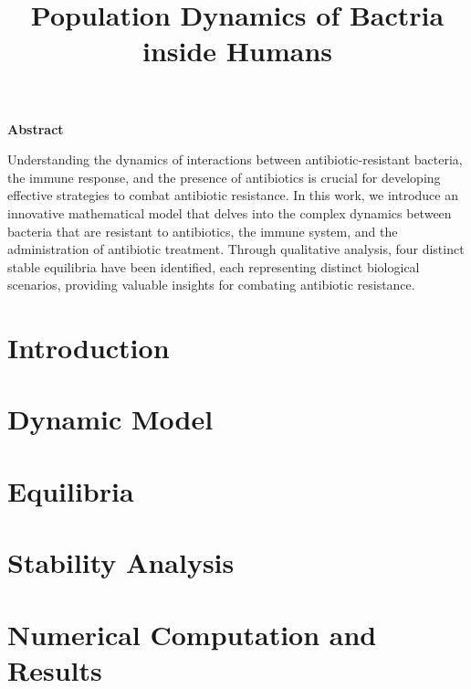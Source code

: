 \documentclass[11pt]{article}
\title{Population Dynamics of Bactria inside Humans}
\date{}
\theoremstyle{definition}
\begin{document}
	\graphicspath{{../figs/}}
	
	
	
	\newpage
	\setcounter{page}{2}
	
	\begin{center}
		\LARGE{\textbf{Abstract}}
		
		\vspace{1cm}
		
		
	\end{center}
	
	\begin{flushleft}
		\Large 
		Understanding the dynamics of interactions between antibiotic-resistant 	bacteria, the immune
		response, and the presence of antibiotics is crucial for developing effective strategies to combat
		antibiotic resistance. In this work, we introduce an innovative mathematical model that delves
		into the complex dynamics between bacteria that are resistant to antibiotics, the immune
		system, and the administration of antibiotic treatment. Through qualitative analysis, four
		distinct stable equilibria have been identified, each representing distinct biological scenarios,
		providing valuable insights for combating antibiotic resistance.
		
	\end{flushleft}
	
	\newpage	
	
	\tableofcontents
	
	\newpage
	
	\section{Introduction} 
	
	
	\newpage
	\section{Dynamic Model} 
	
	
	\newpage
	\section{Equilibria} 
	
	
	\newpage
	\section{Stability Analysis} 
	
	
	\newpage
	\section{Numerical Computation and Results} 
	
	
	\newpage
	\nocite{*}
	\printbibliography
	
	
\end{document}
